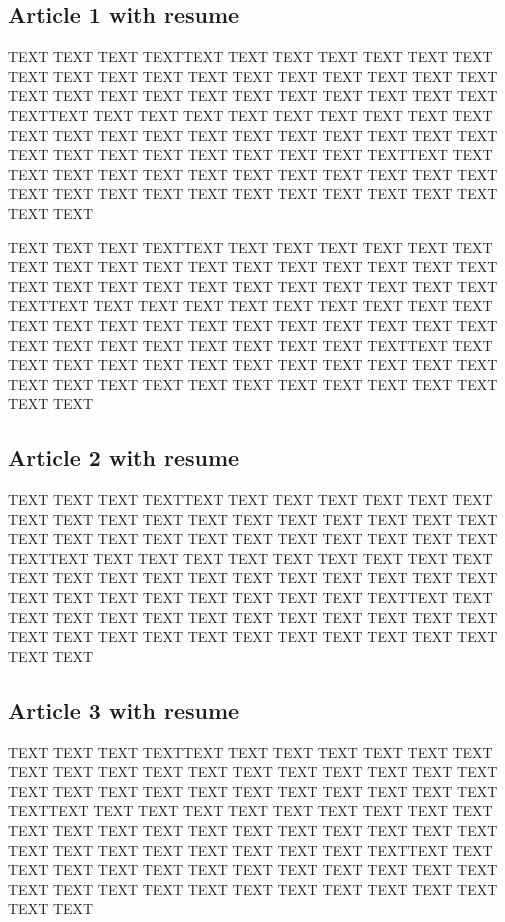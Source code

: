 \documentclass[10pt,conference,letterpaper]{IEEEtran}
\begin{document}
\subsection{Article 1 with resume}
%
%
\par 
TEXT TEXT TEXT TEXTTEXT TEXT TEXT TEXT  TEXT TEXT  TEXT TEXT  TEXT TEXT  TEXT TEXT  TEXT TEXT  TEXT TEXT  TEXT TEXT  TEXT TEXT  TEXT TEXT  TEXT TEXT  TEXT TEXT 
TEXT TEXT TEXT TEXTTEXT TEXT TEXT TEXT  TEXT TEXT  TEXT TEXT  TEXT TEXT  TEXT TEXT  TEXT TEXT  TEXT TEXT  TEXT TEXT  TEXT TEXT  TEXT TEXT  TEXT TEXT  TEXT TEXT 
TEXT TEXT TEXT TEXTTEXT TEXT TEXT TEXT  TEXT TEXT  TEXT TEXT  TEXT TEXT  TEXT TEXT  TEXT TEXT  TEXT TEXT  TEXT TEXT  TEXT TEXT  TEXT TEXT  TEXT TEXT  TEXT TEXT 
\par 
TEXT TEXT TEXT TEXTTEXT TEXT TEXT TEXT  TEXT TEXT  TEXT TEXT  TEXT TEXT  TEXT TEXT  TEXT TEXT  TEXT TEXT  TEXT TEXT  TEXT TEXT  TEXT TEXT  TEXT TEXT  TEXT TEXT 
TEXT TEXT TEXT TEXTTEXT TEXT TEXT TEXT  TEXT TEXT  TEXT TEXT  TEXT TEXT  TEXT TEXT  TEXT TEXT  TEXT TEXT  TEXT TEXT  TEXT TEXT  TEXT TEXT  TEXT TEXT  TEXT TEXT 
TEXT TEXT TEXT TEXTTEXT TEXT TEXT TEXT  TEXT TEXT  TEXT TEXT  TEXT TEXT  TEXT TEXT  TEXT TEXT  TEXT TEXT  TEXT TEXT  TEXT TEXT  TEXT TEXT  TEXT TEXT  TEXT TEXT 

\subsection{Article 2 with resume}
%
\par 
TEXT TEXT TEXT TEXTTEXT TEXT TEXT TEXT  TEXT TEXT  TEXT TEXT  TEXT TEXT  TEXT TEXT  TEXT TEXT  TEXT TEXT  TEXT TEXT  TEXT TEXT  TEXT TEXT  TEXT TEXT  TEXT TEXT 
TEXT TEXT TEXT TEXTTEXT TEXT TEXT TEXT  TEXT TEXT  TEXT TEXT  TEXT TEXT  TEXT TEXT  TEXT TEXT  TEXT TEXT  TEXT TEXT  TEXT TEXT  TEXT TEXT  TEXT TEXT  TEXT TEXT 
TEXT TEXT TEXT TEXTTEXT TEXT TEXT TEXT  TEXT TEXT  TEXT TEXT  TEXT TEXT  TEXT TEXT  TEXT TEXT  TEXT TEXT  TEXT TEXT  TEXT TEXT  TEXT TEXT  TEXT TEXT  TEXT TEXT 

\subsection{Article 3 with resume}
%
\par 
TEXT TEXT TEXT TEXTTEXT TEXT TEXT TEXT  TEXT TEXT  TEXT TEXT  TEXT TEXT  TEXT TEXT  TEXT TEXT  TEXT TEXT  TEXT TEXT  TEXT TEXT  TEXT TEXT  TEXT TEXT  TEXT TEXT 
TEXT TEXT TEXT TEXTTEXT TEXT TEXT TEXT  TEXT TEXT  TEXT TEXT  TEXT TEXT  TEXT TEXT  TEXT TEXT  TEXT TEXT  TEXT TEXT  TEXT TEXT  TEXT TEXT  TEXT TEXT  TEXT TEXT 
TEXT TEXT TEXT TEXTTEXT TEXT TEXT TEXT  TEXT TEXT  TEXT TEXT  TEXT TEXT  TEXT TEXT  TEXT TEXT  TEXT TEXT  TEXT TEXT  TEXT TEXT  TEXT TEXT  TEXT TEXT  TEXT TEXT 
\end{document}
